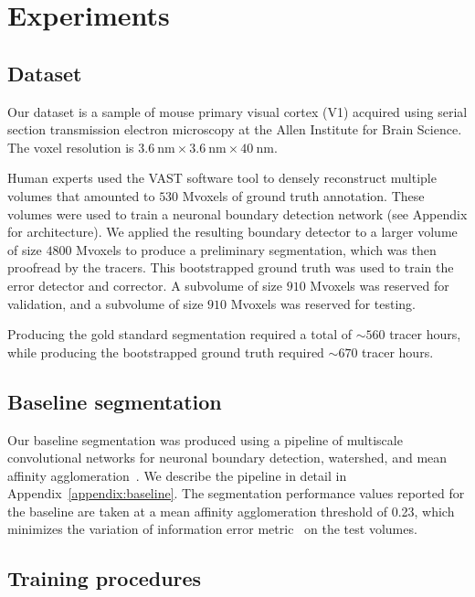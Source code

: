 \documentclass{article}
\begin{document}
\section{Experiments}
\subsection{Dataset}


Our dataset is a sample of mouse primary visual cortex (V1) acquired using serial section transmission electron microscopy at the Allen Institute for Brain Science. The voxel resolution is $3.6~\text{nm} \times 3.6~\text{nm} \times 40~\text{nm}$.

Human experts used the VAST software tool \cite{kasthuri2015saturated, VAST} to densely reconstruct multiple volumes that amounted to $530$ Mvoxels of ground truth annotation. These volumes were used to train a neuronal boundary detection network (see Appendix for architecture). We applied the resulting boundary detector to a larger volume of size $4800$ Mvoxels to produce a preliminary segmentation, which was then proofread by the tracers. This bootstrapped ground truth was used to train the error detector and corrector. A subvolume of size $910$ Mvoxels was reserved for validation, and a subvolume of size $910$ Mvoxels was reserved for testing.

Producing the gold standard segmentation required a total of $\sim 560$ tracer hours, while producing the bootstrapped ground truth required $\sim 670$ tracer hours.

\subsection{Baseline segmentation}
Our baseline segmentation was produced using a pipeline of multiscale convolutional networks for neuronal boundary detection, watershed, and mean affinity agglomeration~\cite{kisuk}. We describe the pipeline in detail in Appendix~\ref{appendix:baseline}. The segmentation performance values reported for the baseline are taken at a mean affinity agglomeration threshold of 0.23, which minimizes the variation of information error metric~\cite{meila2007,vi} on the test volumes.

\subsection{Training procedures}
\end{document}
